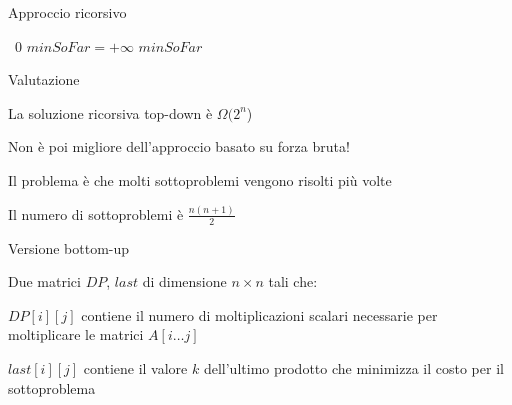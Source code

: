 \begin{frame}{Approccio ricorsivo}

\vspace{-6pt}
\begin{Procedure}
\caption[A]{\INTEGER {}($\INTEGER[\,]\ c$, \INTEGER $i$, \INTEGER $j$)}
{ \Return\ $0$\; }
{
  $\mathit{minSoFar} = +\infty$\;
  \Return $\mathit{minSoFar}$\;
}
\end{Procedure}


\end{frame}

\begin{frame}{Valutazione}

\vspace{-6pt}
\BIL
\item La soluzione ricorsiva top-down è $\Omega(2^n$)
\item Non è poi migliore dell'approccio basato su forza bruta!
\item Il problema è che molti sottoproblemi vengono risolti più volte
\item Il numero di sottoproblemi è $\frac{n(n+1)}{2}$
\EIL

\end{frame}

\begin{frame}{Versione bottom-up}

\vspace{-6pt}
\begin{myboxtitle}
Due matrici $DP$, $\mathit{last}$ di dimensione $n \times n$ tali che:
\BIL
\item $DP[i][j]$ contiene il numero di moltiplicazioni scalari necessarie
per moltiplicare le matrici $A[i \ldots j]$
\item $\mathit{last}[i][j]$ contiene il valore $k$ dell'ultimo prodotto che minimizza il costo per il sottoproblema
\EIL
\end{myboxtitle}
\end{frame}

